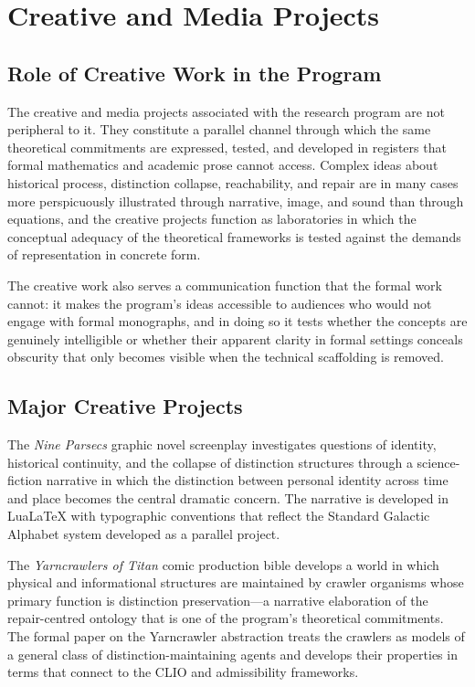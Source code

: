 \documentclass[11pt, oneside]{book}
\theoremstyle{definition}
\theoremstyle{remark}
\begin{document}
\chapter{Creative and Media Projects}

\section{Role of Creative Work in the Program}

The creative and media projects associated with the research program are not peripheral to it. They constitute a parallel channel through which the same theoretical commitments are expressed, tested, and developed in registers that formal mathematics and academic prose cannot access. Complex ideas about historical process, distinction collapse, reachability, and repair are in many cases more perspicuously illustrated through narrative, image, and sound than through equations, and the creative projects function as laboratories in which the conceptual adequacy of the theoretical frameworks is tested against the demands of representation in concrete form.

The creative work also serves a communication function that the formal work cannot: it makes the program's ideas accessible to audiences who would not engage with formal monographs, and in doing so it tests whether the concepts are genuinely intelligible or whether their apparent clarity in formal settings conceals obscurity that only becomes visible when the technical scaffolding is removed.

\section{Major Creative Projects}

The \textit{Nine Parsecs} graphic novel screenplay investigates questions of identity, historical continuity, and the collapse of distinction structures through a science-fiction narrative in which the distinction between personal identity across time and place becomes the central dramatic concern. The narrative is developed in LuaLaTeX with typographic conventions that reflect the Standard Galactic Alphabet system developed as a parallel project.

The \textit{Yarncrawlers of Titan} comic production bible develops a world in which physical and informational structures are maintained by crawler organisms whose primary function is distinction preservation—a narrative elaboration of the repair-centred ontology that is one of the program's theoretical commitments. The formal paper on the Yarncrawler abstraction treats the crawlers as models of a general class of distinction-maintaining agents and develops their properties in terms that connect to the CLIO and admissibility frameworks.
\end{document}
